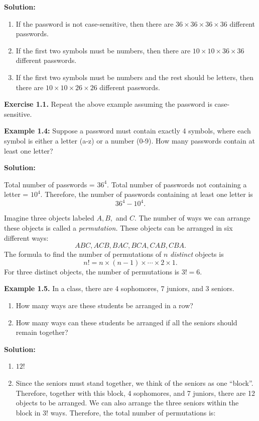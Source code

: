\documentclass[
  12pt,
]{krantzNoCorner}
\providecommand{\tightlist}{%
  \setlength{\itemsep}{0pt}\setlength{\parskip}{0pt}}
\begin{document}
\textbf{Solution:}

\begin{enumerate}
\def\labelenumi{\arabic{enumi}.}
\tightlist
\item
  If the password is not case-sensitive, then there are
  \(36\times36\times36\times36\) different passwords.
\item
  If the first two symbols must be numbers, then there are
  \(10\times10\times36\times36\) different passwords.
\item
  If the first two symbols must be numbers and the rest should be
  letters, then there are \(10\times10\times26\times26\) different
  passwords.
\end{enumerate}

\textbf{Exercise 1.1.} Repeat the above example assuming the password is
case-sensitive.

\textbf{Example 1.4:} Suppose a password must contain exactly 4 symbols,
where each symbol is either a letter (a-z) or a number (0-9). How many
passwords contain at least one letter?

\textbf{Solution:}

Total number of passwords = \(36^4\). Total number of passwords not
containing a letter = \(10^4\). Therefore, the number of passwords
containing at least one letter is \[36^4-10^4.\]

Imagine three objects labeled \(A,B,\) and \(C.\) The number of ways we can
arrange these objects is called a \emph{permutation.} These objects can be
arranged in six different ways: \[ABC, ACB, BAC, BCA, CAB, CBA.\] The
formula to find the number of permutations of \(n\) \emph{distinct} objects is
\[n!=n\times (n-1)\times\cdots\times 2\times 1.\] For three distinct
objects, the number of permutations is \(3!=6.\)

\textbf{Example 1.5.} In a class, there are 4 sophomores, 7 juniors, and 3
seniors.

\begin{enumerate}
\def\labelenumi{\arabic{enumi}.}
\tightlist
\item
  How many ways are these students be arranged in a row?
\item
  How many ways can these students be arranged if all the seniors
  should remain together?
\end{enumerate}

\textbf{Solution:}

\begin{enumerate}
\def\labelenumi{\arabic{enumi}.}
\tightlist
\item
  \(12!\)
\item
  Since the seniors must stand together, we think of the seniors as
  one ``block''. Therefore, together with this block, 4 sophomores,
  and 7 juniors, there are 12 objects to be arranged. We can also
  arrange the three seniors within the block in \(3!\) ways. Therefore,
  the total number of permutations is:
\end{enumerate}
\end{document}
